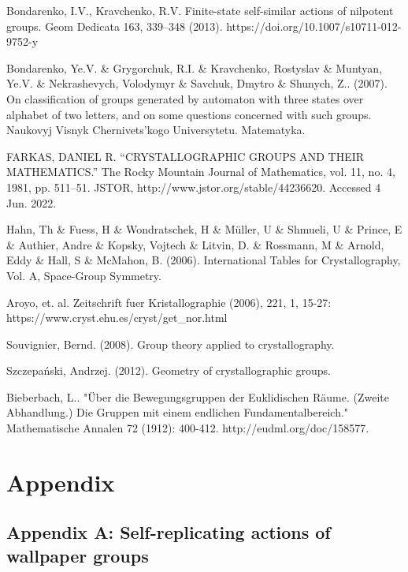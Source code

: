 \documentclass[a4paper,12pt]{amsart}
\theoremstyle{definition}
\begin{document}
\begin{thebibliography}{9}
		
		Bondarenko, I.V., Kravchenko, R.V. Finite-state self-similar actions of nilpotent groups. Geom Dedicata 163, 339–348 (2013). https://doi.org/10.1007/s10711-012-9752-y
		
		Bondarenko, Ye.V. \& Grygorchuk, R.I. \& Kravchenko, Rostyslav \& Muntyan, Ye.V. \& Nekrashevych, Volodymyr \& Savchuk, Dmytro \& Shunych, Z.. (2007). On classification of groups generated by automaton with three states over alphabet of two letters, and on some questions concerned with such groups. Naukovyj Visnyk Chernivets’kogo Universytetu. Matematyka. 
		
		FARKAS, DANIEL R. “CRYSTALLOGRAPHIC GROUPS AND THEIR MATHEMATICS.” The Rocky Mountain Journal of Mathematics, vol. 11, no. 4, 1981, pp. 511–51. JSTOR, http://www.jstor.org/stable/44236620. Accessed 4 Jun. 2022.
		
		 Hahn, Th \& Fuess, H \& Wondratschek, H \& Müller, U \& Shmueli, U \& Prince, E \& Authier, Andre \& Kopsky, Vojtech \& Litvin, D. \& Rossmann, M \& Arnold, Eddy \& Hall, S \& McMahon, B. (2006). International Tables for Crystallography, Vol. A, Space-Group Symmetry. 
		
		 Aroyo, et. al. Zeitschrift fuer Kristallographie (2006), 221, 1, 15-27: https://www.cryst.ehu.es/cryst/get\_nor.html
		
		 Souvignier, Bernd. (2008). Group theory applied to crystallography. 
		
		 Szczepański, Andrzej. (2012). Geometry of crystallographic groups. 	
		
		Bieberbach, L.. "Über die Bewegungsgruppen der Euklidischen Räume. (Zweite Abhandlung.) Die Gruppen mit einem endlichen Fundamentalbereich." Mathematische Annalen 72 (1912): 400-412. http://eudml.org/doc/158577.
		
		
	\end{thebibliography}
	
	\newpage
	
	\section{Appendix}
	\subsection{Appendix A: Self-replicating actions of wallpaper groups}
	
\end{document}
